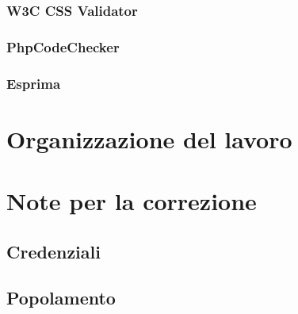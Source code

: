 \documentclass[a4paper, oneside, openany, dvipsnames, table]{article}
\begin{document}
		\subsubsection{W3C CSS Validator}
			
		\subsubsection{PhpCodeChecker}
			
		\subsubsection{Esprima}
			
			
\newpage
\section{Organizzazione del lavoro}
	
	
\appendix
{}
\newpage
\section{Note per la correzione}
	
	\subsection{Credenziali}
		
	\subsection{Popolamento}
		

\newpage
\end{document}
